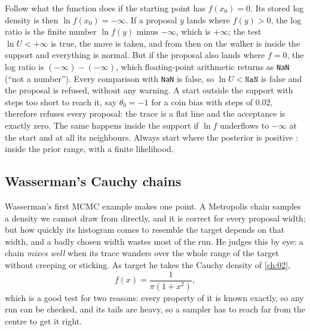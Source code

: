\begin{pitfall}
Follow what the function does if the starting point has $f(x_0)=0$. Its stored log density is
then $\ln f(x_0)=-\infty$. If a proposal $y$ lands where $f(y)>0$, the log ratio is the finite
number $\ln f(y)$ minus $-\infty$, which is $+\infty$; the test $\ln U<+\infty$ is true, the move is
taken, and from then on the walker is inside the support and everything is normal. But if the
proposal also lands where $f=0$, the log ratio is $(-\infty)-(-\infty)$, which floating-point
arithmetic returns as \texttt{NaN} (``not a number''). Every comparison with \texttt{NaN} is
false, so $\ln U<\texttt{NaN}$ is false and the proposal is refused, without any warning. A start
outside the support with steps too short to reach it, say $\theta_0=-1$ for a coin bias with
steps of 0.02, therefore refuses every proposal: the trace is a flat line and the acceptance is
exactly zero. The same happens inside the support if $\ln f$ underflows to $-\infty$ at the start
and at all its neighbours. Always start where the posterior is positive
: inside the prior range, with a finite likelihood.
\end{pitfall}

\subsection{Wasserman's Cauchy chains}
\label{9b:sec:wasserman-cauchy}

Wasserman's first MCMC example  makes one point. A
Metropolis chain samples a density we cannot draw from directly, and it is correct for every
proposal width; but how quickly its histogram comes to resemble the target depends on that width,
and a badly chosen width wastes most of the run. He judges this by eye: a chain \emph{mixes well}
when its trace wanders over the whole range of the target without creeping or sticking. As target
he takes the Cauchy density of \cref{ch:02},
\begin{equation*}
  f(x)=\frac{1}{\pi(1+x^2)},
\end{equation*}
which is a good test for two reasons: every property of it is known exactly, so any run can be
checked, and its tails are heavy, so a sampler has to reach far from the centre to get it right.

